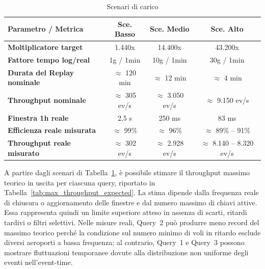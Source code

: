 \documentclass[conference]{IEEEtran}
\begin{document}
\begin{table}[htbp]
\centering
\vspace{-12.5px}
\caption{Scenari di carico}
\label{tab:acceleration_scenarios}
\scriptsize
\setlength{\tabcolsep}{2pt}
\begin{tabular}{lccc}
\toprule
\textbf{Parametro / Metrica} & \textbf{Sce. Basso} & \textbf{Sce. Medio} & \textbf{Sce. Alto} \\
\midrule
\textbf{Moltiplicatore target} & 1.440x & 14.400x & 43.200x \\
\textbf{Fattore tempo log/real} & 1g / 1min & 10g / 1min & 30g / 1min \\
\textbf{Durata del Replay nominale} & $\approx$ 120 min & $\approx$ 12 min & $\approx$ 4 min \\
\textbf{Throughput nominale} & $\approx$ 305 ev/s & $\approx$ 3.050 ev/s & $\approx$ 9.150 ev/s \\
\textbf{Finestra 1h reale} & 2,5 s & 250 ms & 83 ms \\
\midrule
\textbf{Efficienza reale misurata} & $\approx$ 99\% & $\approx$ 96\% & $\approx$ 89\% -- 91\% \\
\textbf{Throughput reale misurato} & $\approx$ 302 ev/s & $\approx$ 2.928 ev/s & $\approx$ 8.140 -- 8.320 ev/s \\
\bottomrule
\end{tabular}
\end{table}

A partire dagli scenari di Tabella~\ref{tab:acceleration_scenarios}, è possibile stimare il throughput massimo teorico in uscita per ciascuna query, riportato in Tabella~\ref{tab:max_throughput_expected}. La stima dipende dalla frequenza reale di chiusura o aggiornamento delle finestre e dal numero massimo di chiavi attive. Essa rappresenta quindi un limite superiore atteso in assenza di scarti, ritardi tardivi o filtri selettivi. Nelle misure reali, Query~2 può produrre meno record del massimo teorico perché la condizione sul numero minimo di voli in ritardo esclude diversi aeroporti a bassa frequenza; al contrario, Query~1 e Query~3 possono mostrare fluttuazioni temporanee dovute alla distribuzione non uniforme degli eventi nell'event-time.
\end{document}

